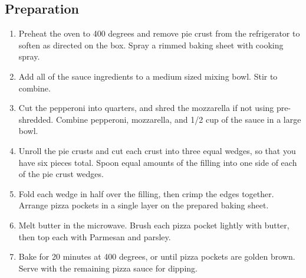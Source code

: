 \subsection{Preparation}
\begin{enumerate}
  \item Preheat the oven to 400 degrees and remove pie crust from the refrigerator to soften as directed on the box. Spray a rimmed baking sheet with cooking spray.
  \item Add all of the sauce ingredients to a medium sized mixing bowl. Stir to combine.
  \item Cut the pepperoni into quarters, and shred the mozzarella if not using pre-shredded. Combine pepperoni, mozzarella, and 1/2 cup of the sauce in a large bowl.
  \item Unroll the pie crusts and cut each crust into three equal wedges, so that you have six pieces total. Spoon equal amounts of the filling into one side of each of the pie crust wedges.
  \item Fold each wedge in half over the filling, then crimp the edges together. Arrange pizza pockets in a single layer on the prepared baking sheet.
  \item Melt butter in the microwave. Brush each pizza pocket lightly with butter, then top each with Parmesan and parsley. 
  \item Bake for 20 minutes at 400 degrees, or until pizza pockets are golden brown. Serve with the remaining pizza sauce for dipping.
\end{enumerate}

